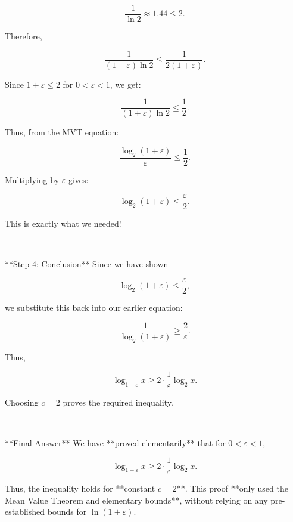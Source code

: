 {       \[
       \frac{1}{\ln 2} \approx 1.44 \leq 2.
       \]
       
       Therefore,
       
       \[
       \frac{1}{(1+\varepsilon) \ln 2} \leq \frac{1}{2(1+\varepsilon)}.
       \]
       
       Since \( 1+\varepsilon \leq 2 \) for \( 0 < \varepsilon < 1 \), we get:
       
       \[
       \frac{1}{(1+\varepsilon) \ln 2} \leq \frac{1}{2}.
       \]
       
       Thus, from the MVT equation:
       
       \[
       \frac{\log_2(1+\varepsilon)}{\varepsilon} \leq \frac{1}{2}.
       \]
       
       Multiplying by \( \varepsilon \) gives:
       
       \[
       \log_2(1+\varepsilon) \leq \frac{\varepsilon}{2}.
       \]
       
       This is exactly what we needed!
       
       ---
       
         **Step 4: Conclusion**
       Since we have shown
       
       \[
       \log_2(1+\varepsilon) \leq \frac{\varepsilon}{2},
       \]
       
       we substitute this back into our earlier equation:
       
       \[
       \frac{1}{\log_2(1+\varepsilon)} \geq \frac{2}{\varepsilon}.
       \]
       
       Thus,
       
       \[
       \log_{1+\varepsilon} x \geq 2 \cdot \frac{1}{\varepsilon} \log_2 x.
       \]
       
       Choosing \( c = 2 \) proves the required inequality.
       
---

  **Final Answer**
We have **proved elementarily** that for \( 0 < \varepsilon < 1 \),

\[
\log_{1+\varepsilon} x \geq 2 \cdot \frac{1}{\varepsilon} \log_2 x.
\]

Thus, the inequality holds for **constant \( c = 2 \)**. This proof **only used the Mean Value Theorem and elementary bounds**, without relying on any pre-established bounds for \( \ln(1+\varepsilon) \).
} %


